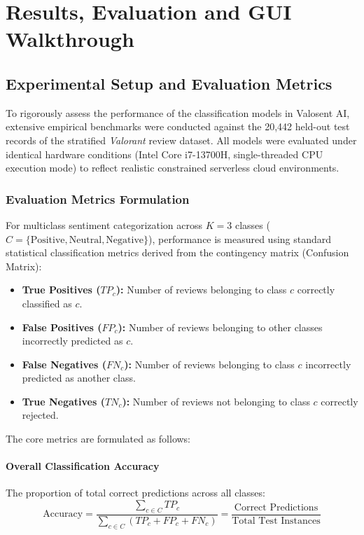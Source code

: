 \chapter{Results, Evaluation and GUI Walkthrough}
\label{chap:results_evaluation}

\section{Experimental Setup and Evaluation Metrics}
\label{sec:eval_setup}

To rigorously assess the performance of the classification models in Valosent AI, extensive empirical benchmarks were conducted against the 20,442 held-out test records of the stratified \textit{Valorant} review dataset. All models were evaluated under identical hardware conditions (Intel Core i7-13700H, single-threaded CPU execution mode) to reflect realistic constrained serverless cloud environments.

\subsection{Evaluation Metrics Formulation}
For multiclass sentiment categorization across $K = 3$ classes ($C = \{\text{Positive}, \text{Neutral}, \text{Negative}\}$), performance is measured using standard statistical classification metrics derived from the contingency matrix (Confusion Matrix):
\begin{itemize}
    \item \textbf{True Positives ($TP_c$):} Number of reviews belonging to class $c$ correctly classified as $c$.
    \item \textbf{False Positives ($FP_c$):} Number of reviews belonging to other classes incorrectly predicted as $c$.
    \item \textbf{False Negatives ($FN_c$):} Number of reviews belonging to class $c$ incorrectly predicted as another class.
    \item \textbf{True Negatives ($TN_c$):} Number of reviews not belonging to class $c$ correctly rejected.
\end{itemize}

The core metrics are formulated as follows:

\subsubsection{Overall Classification Accuracy}
The proportion of total correct predictions across all classes:
\begin{equation}
    \text{Accuracy} = \frac{\sum_{c \in C} TP_c}{\sum_{c \in C} (TP_c + FP_c + FN_c)} = \frac{\text{Correct Predictions}}{\text{Total Test Instances}}
    \label{eq:accuracy}
\end{equation}

